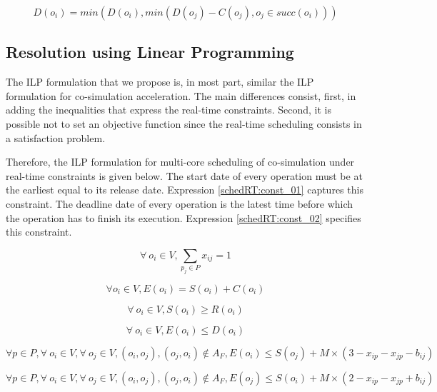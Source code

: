 \begin{equation} 
D(o_i) = min(D(o_i), min(D(o_j) - C(o_j), o_j \in succ(o_i)))
\label{eq:modde}
\end{equation}   

\subsection{Resolution using Linear Programming}

The ILP formulation that we propose is, in most part, similar the ILP formulation for co-simulation acceleration. The main differences consist, first, in adding the inequalities that express the real-time constraints. Second, it is possible not to set an objective function since the real-time scheduling consists in a satisfaction problem.

Therefore, the ILP formulation for multi-core scheduling of co-simulation under real-time constraints is given below. The start date of every operation must be at the earliest equal to its release date. Expression \ref{schedRT:const_01} captures this constraint. The deadline date of every operation is the latest time before which the operation has to finish its execution. Expression \ref{schedRT:const_02} specifies this constraint.

\begin{equation}
\forall\ o_i \in V, \sum_{p_j \in P}x_{ij}=1
\label{schedRT:const_1}
\end{equation}

\begin{equation}
\forall o_i \in V, E(o_i) = S(o_i) + C(o_i)
\label{schedRT:const_2}
\end{equation}

\begin{equation}
\forall\ o_i \in V, S(o_i) \geq R(o_i)
\label{schedRT:const_01}
\end{equation}

\begin{equation}
\forall\ o_i \in V, E(o_i) \leq D(o_i)
\label{schedRT:const_02}
\end{equation}

\begin{equation}
\forall p \in P, \forall\ o_i \in V, \forall\ o_j \in V, (o_i,o_j), (o_j,o_i) \notin A_F, E(o_i) \leq S(o_j) + M \times (3 - x_{ip} - x_{jp} - b_{ij}) 
\label{schedRT:const_11}
\end{equation}

\begin{equation}
\forall p \in P, \forall\ o_i \in V, \forall\ o_j \in V, (o_i,o_j), (o_j,o_i) \notin A_F, E(o_j) \leq S(o_i) + M \times (2 - x_{ip} - x_{jp} + b_{ij}) 
\label{schedRT:const_12}
\end{equation}

